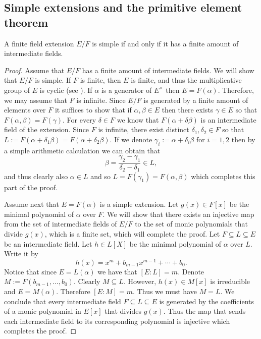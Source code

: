 \documentclass[11pt,a4paper]{article}
\begin{document}
\subsection{Simple extensions and the primitive element theorem}
\begin{theorem}
  \label{thm:finite-fields-extensions-are-simple-iff-finite-amount-of-intermediate-fields}
  A finite field extension $E/F$ is simple if and only if it has a finite
  amount of intermediate fields.
\end{theorem}
\begin{proof}
  Assume that $E/F$ has a finite amount of intermediate fields.
  We will show that $E/F$ is simple.
  If $F$ is finite, then $E$ is finite,
  and thus the multiplicative group of $E$ is cyclic
  (see ).
  If $\alpha$ is a generator of $E^{\times}$ then $E = F(\alpha)$.
  Therefore, we may assume that $F$ is infinite.
  Since $E/F$ is generated by a finite amount of elements over $F$
  it suffices to show that if $\alpha, \beta \in E$ then there exists
  $\gamma \in E$ so that $F(\alpha,\beta) = F(\gamma)$.
  For every $\delta \in F$ we know that $F(\alpha + \delta \beta)$
  is an intermediate field of the extension.
  Since $F$ is infinite, there exist distinct $\delta_1, \delta_2 \in F$
  so that $L := F(\alpha + \delta_1 \beta) = F(\alpha + \delta_2 \beta)$.
  If we denote $\gamma_i := \alpha + \delta_i \beta$
  for $i = 1,2$ then by a simple arithmetic calculation we can obtain that
  \[
    \beta = \frac{\gamma_2 - \gamma_1}{\delta_2 - \delta_1} \in L,
  \]
  and thus clearly also $\alpha \in L$
  and so $L = F(\gamma_1) = F(\alpha,\beta)$ which completes this part
  of the proof.

  Assume next that $E = F(\alpha)$ is a simple extension.
  Let $g(x) \in F[x]$ be the minimal polynomial of $\alpha$ over $F$.
  We will show that there exists an injective map from the set of intermediate
  fields of $E/F$ to the set of monic polynomials that divide $g(x)$,
  which is a finite set, which will complete the proof.
  Let $F \subseteq L \subseteq E$ be an intermediate field.
  Let $h \in L[X]$ be the minimal polynomial of $\alpha$ over $L$.
  Write it by
  \[
    h(x) = x^m + b_{m-1} x^{m-1} + \cdots + b_0.
  \]
  Notice that since $E = L(\alpha)$ we have that $[E : L] = m$.
  Denote $M := F(b_{m-1},\dots,b_0)$.
  Clearly $M \subseteq L$.
  However, $h(x) \in M[x]$ is irreducible and $E = M(\alpha)$.
  Therefore $[E : M] = m$.
  Thus we must have $M = L$.
  We conclude that every intermediate field $F \subseteq L \subseteq E$
  is generated by the coefficients of a monic polynomial in $E[x]$
  that divides $g(x)$.
  Thus the map that sends each intermediate field to its corresponding
  polynomial is injective which completes the proof.
\end{proof}
\end{document}
